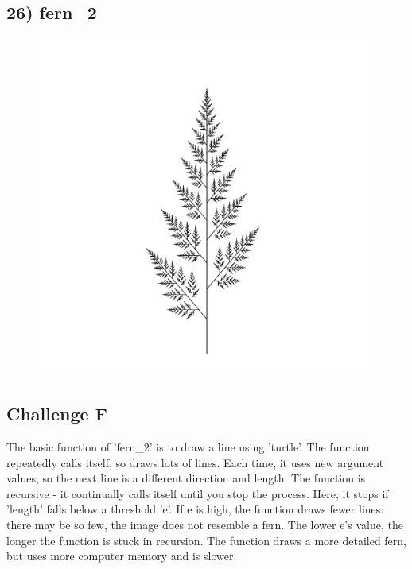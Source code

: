 \documentclass[11pt]{article}
\begin{document}
\subsection*{26) fern\_2}
\begin{figure}[h]
\includegraphics[width=0.8\linewidth]{../Results/26_fern_2.pdf}
\end{figure}

\subsection*{Challenge F}
\begin{figure}[h]
\end{figure}

The basic function of 'fern\_2' is to draw a line using 'turtle'. The function repeatedly calls itself, so draws lots of lines. Each time, it uses new argument values, so the next line is a different direction and length. The function is recursive - it continually calls itself until you stop the process. Here, it stops if 'length' falls below a threshold 'e'. If e is high, the function draws fewer lines: there may be so few, the image does not resemble a fern. The lower e's value, the longer the function is stuck in recursion. The function draws a more detailed fern, but uses more computer memory and is slower.

\newpage
\end{document}
